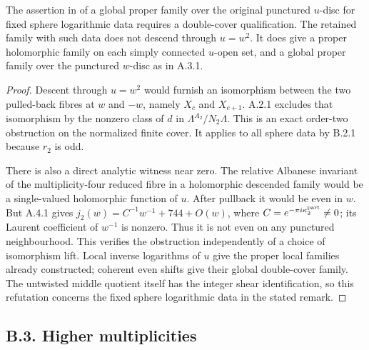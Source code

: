 \begin{proposition}\label{fam:src:B.2.3}\label{fam:st:B.2.3}
The assertion in \cite[Remark 8.1]{E26} of a global proper family over the original punctured $u$-disc for fixed sphere logarithmic data requires a double-cover qualification. The retained family with such data does not descend through $u=w^2$. It does give a proper holomorphic family on each simply connected $u$-open set, and a global proper family over the punctured $w$-disc as in A.3.1.
\end{proposition}
\begin{proof}
Descent through $u=w^2$ would furnish an isomorphism between the two pulled-back fibres at $w$ and $-w$, namely $X_c$ and $X_{c+1}$. A.2.1 excludes that isomorphism by the nonzero class of $d$ in $\Lambda^{A_2}/N_2\Lambda$. This is an exact order-two obstruction on the normalized finite cover. It applies to all sphere data by B.2.1 because $r_2$ is odd.

There is also a direct analytic witness near zero. The relative Albanese invariant of the multiplicity-four reduced fibre in a holomorphic descended family would be a single-valued holomorphic function of $u$. After pullback it would be even in $w$. But A.4.1 gives $j_2(w)=C^{-1}w^{-1}+744+O(w)$, where $C=e^{-\pi i\kappa_2^{\rm part}}\ne0$; its Laurent coefficient of $w^{-1}$ is nonzero. Thus it is not even on any punctured neighbourhood. This verifies the obstruction independently of a choice of isomorphism lift. Local inverse logarithms of $u$ give the proper local families already constructed; coherent even shifts give their global double-cover family. The untwisted middle quotient itself has the integer shear identification, so this refutation concerns the fixed sphere logarithmic data in the stated remark.
\end{proof}

\subsection{B.3. Higher multiplicities}

